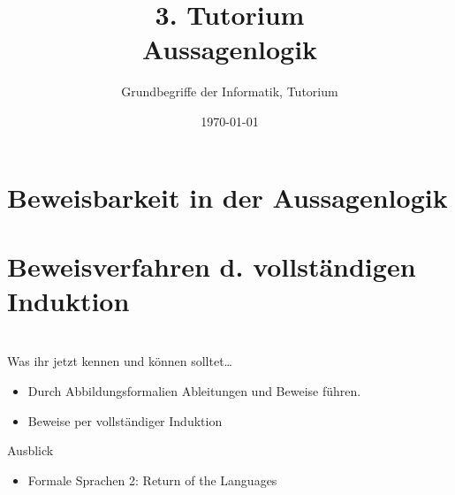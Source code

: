 




\title[Aussagenlogik]{3. Tutorium\\ Aussagenlogik}
\subtitle{Grundbegriffe der Informatik, Tutorium \hashtag\mytutnumber}
\date{\today}
\usepackage{tikz}


\titleframe
\roadmap


\section{Beweisbarkeit in der Aussagenlogik}




\section[Vollständige Induktion]{Beweisverfahren d. vollständigen Induktion}







\section{}
	\begin{frame}{Was ihr jetzt kennen und können solltet\dots}
			\begin{itemize}
				\item Durch Abbildungsformalien Ableitungen und Beweise führen.
				\item Beweise per vollständiger Induktion
			\end{itemize}
	
	\end{frame}
\begin{frame}[fragile]{Ausblick}
 		\begin{itemize}
 			\item Formale Sprachen 2: Return of the Languages
 		\end{itemize}
\end{frame}
\section{}
\questionframe
\lastframe
{}
